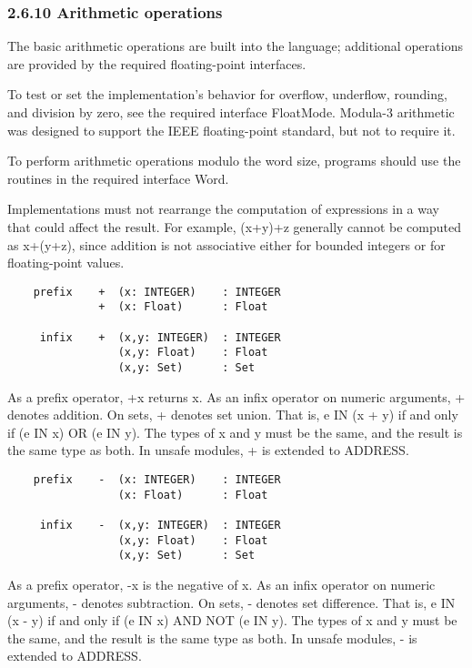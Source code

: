 \documentclass[10pt]{article}
\begin{document}
\subsubsection*{2.6.10 Arithmetic operations}

The basic arithmetic operations are built into the language; additional
operations are provided by the required floating-point interfaces.

To test or set the implementation's behavior for overflow, underflow,
rounding, and division by zero, see the required interface FloatMode.  Modula-3
arithmetic was designed to support the IEEE floating-point standard, but not
to require it.

To perform arithmetic operations modulo the word size, programs should use the
routines in the required interface Word.

Implementations must not rearrange the computation of expressions in a way
that could affect the result.  For example, (x+y)+z generally cannot be
computed as x+(y+z), since addition is not associative either for bounded
integers or for floating-point values.

\begin{verbatim}
    prefix    +  (x: INTEGER)    : INTEGER
              +  (x: Float)      : Float

     infix    +  (x,y: INTEGER)  : INTEGER
                 (x,y: Float)    : Float
                 (x,y: Set)      : Set
\end{verbatim}
As a prefix operator, +x returns x.  As an infix operator on numeric arguments,
+ denotes addition.  On sets, + denotes set union.  That is, e IN (x + y) if and
only if (e IN x) OR (e IN y).  The types of x and y must be the same, and the
result is the same type as both.  In unsafe modules, + is extended to ADDRESS.

\begin{verbatim}
    prefix    -  (x: INTEGER)    : INTEGER
                 (x: Float)      : Float

     infix    -  (x,y: INTEGER)  : INTEGER
                 (x,y: Float)    : Float
                 (x,y: Set)      : Set
\end{verbatim}
As a prefix operator, -x is the negative of x.  As an infix operator on numeric
arguments, - denotes subtraction.  On sets, - denotes set difference.  That is,
e IN (x - y) if and only if (e IN x) AND NOT (e IN y).  The types of x and y
must be the same, and the result is the same type as both.  In unsafe modules,
- is extended to ADDRESS.
\end{document}
